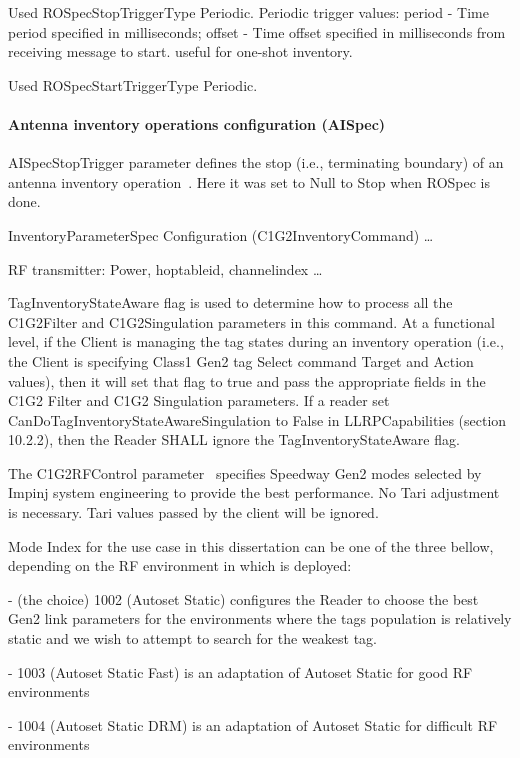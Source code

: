 Used ROSpecStopTriggerType Periodic.
Periodic trigger values: period - Time period specified in milliseconds; offset - Time offset specified in milliseconds from receiving message to start. useful for one-shot inventory.

Used ROSpecStartTriggerType Periodic.

\paragraph{Antenna inventory operations configuration (AISpec)}

AISpecStopTrigger parameter defines the stop (i.e., terminating boundary) of an antenna inventory operation~\cite[sec. 11.2.2.1]{Llrp1standard20101013Pdf}. Here it was set to Null to Stop when ROSpec is done.

InventoryParameterSpec Configuration (C1G2InventoryCommand) \dots

RF transmitter: Power, hoptableid, channelindex \dots

TagInventoryStateAware flag is used to determine how to process all the C1G2Filter and C1G2Singulation parameters in this command. At a functional level, if the Client is managing the tag states during an inventory operation (i.e., the Client is specifying Class1 Gen2 tag Select command Target and Action values), then it will set that flag to true and pass the appropriate fields in the C1G2 Filter and C1G2 Singulation parameters. If a reader set CanDoTagInventoryStateAwareSingulation to False in LLRPCapabilities (section 10.2.2), then the Reader SHALL ignore the TagInventoryStateAware flag.

The C1G2RFControl parameter~\cite[sec. 3.1.4]{ImpinjOctaneLLRP} specifies Speedway Gen2 modes selected by Impinj system engineering to provide the best performance. No Tari adjustment is necessary. Tari values passed by the client will be ignored.

Mode Index for the use case in this dissertation can be one of the three bellow, depending on the RF environment in which is deployed: 

- (the choice) 1002 (Autoset Static) configures the Reader to choose the best Gen2 link parameters for the environments where the tags population is relatively static and we wish to attempt to search for the weakest tag.

- 1003 (Autoset Static Fast) is an adaptation of Autoset Static for good RF environments

- 1004 (Autoset Static DRM) is an adaptation of Autoset Static for difficult RF environments


